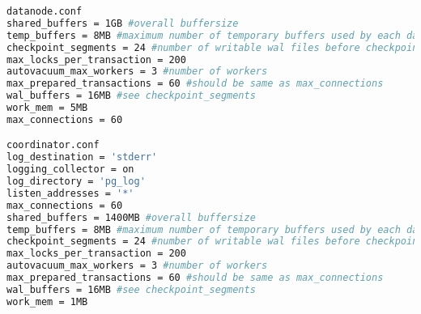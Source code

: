 \begin{lstlisting}[basicstyle=\tiny,language=bash,caption={Konfigurationsdatei pgxc-ctl},captionpos=b]
datanode.conf
shared_buffers = 1GB #overall buffersize
temp_buffers = 8MB #maximum number of temporary buffers used by each database session
checkpoint_segments = 24 #number of writable wal files before checkpoint
max_locks_per_transaction = 200
autovacuum_max_workers = 3 #number of workers
max_prepared_transactions = 60 #should be same as max_connections
wal_buffers = 16MB #see checkpoint_segments
work_mem = 5MB
max_connections = 60

coordinator.conf
log_destination = 'stderr'
logging_collector = on
log_directory = 'pg_log'
listen_addresses = '*'
max_connections = 60
shared_buffers = 1400MB #overall buffersize
temp_buffers = 8MB #maximum number of temporary buffers used by each database session
checkpoint_segments = 24 #number of writable wal files before checkpoint
max_locks_per_transaction = 200
autovacuum_max_workers = 3 #number of workers
max_prepared_transactions = 60 #should be same as max_connections
wal_buffers = 16MB #see checkpoint_segments
work_mem = 1MB
\end{lstlisting} 
 
\newpage